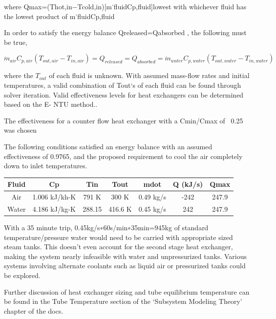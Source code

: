 \documentclass[heading.tex]{subfiles}
\begin{document}
where Qmax=(Thot,in−Tcold,in)[m˙fluidCp,fluid]lowest with whichever fluid has the lowest product of m˙fluidCp,fluid

In order to satisfy the energy balance Qreleased=Qabsorbed , the following must be true,

\begin{equation*}
\dot{m}_{air} C_{p, air} (T_{out, air} - T_{in, air}) = {Q}_{released} = {Q}_{absorbed}= \dot{m}_{water} C_{p,water} (T_{out, water} - T_{in, water})
\end{equation*}

where the $T_{out}$  of each fluid is unknown. With assumed mass-flow rates and initial temperatures, a valid combination of Tout‘s of
each fluid can be found through solver iteration. Valid effectiveness levels for heat exchangers can be determined based on the E- NTU
method..

The effectiveness for a counter flow heat exchanger with a Cmin/Cmax of ~0.25 was chosen 

The following conditions satisfied an energy balance with an assumed effectiveness of 0.9765, and the proposed requirement to cool the
air completely down to inlet temperatures.

\begin{tabular}{|c|c|c|c|c|c|c|}
\hline 
Fluid & Cp & Tin & Tout & mdot & Q (kJ/s) & Qmax \\ 
\hline 
Air & 1.006 kJ/kh-K & 791 K & 300 K & 0.49 kg/s & -242 & 247.9 \\ 
\hline 
Water & 4.186 kJ/kg-K & 288.15 & 416.6 K  & 0.45 kg/s & 242 & 247.9 \\ 
\hline 
\end{tabular} 

With a 35 minute trip, 0.45kg/s∗60s/min∗35min=945kg of standard temperature/pressure water would need to be carried with appropriate
sized steam tanks. This doesn't even account for the second stage heat exchanger, making the system nearly infeasible with water and
unpressurized tanks. Various systems involving alternate coolants such as liquid air or pressurized tanks could be explored.

Further discussion of heat exchanger sizing and tube equilibrium temperature can be found in the Tube Temperature section of the
‘Subsystem Modeling Theory’ chapter of the docs.
\end{document}
